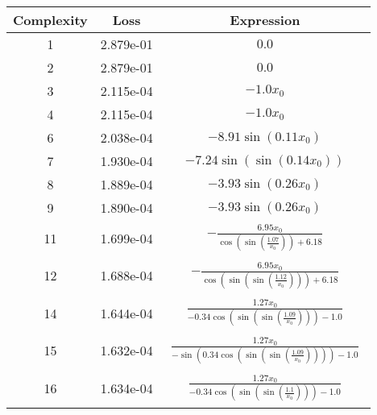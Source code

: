 \begin{center}
        \begin{tabular}{|c|c|c|}
        \hline
        Complexity & Loss & Expression \\
        \hline
        1 & 2.879e-01 & $\begin{aligned}0.0\end{aligned}$\\ \hline2 & 2.879e-01 & $\begin{aligned}0.0\end{aligned}$\\ \hline3 & 2.115e-04 & $\begin{aligned}- 1.0 x_{0}\end{aligned}$\\ \hline4 & 2.115e-04 & $\begin{aligned}- 1.0 x_{0}\end{aligned}$\\ \hline6 & 2.038e-04 & $\begin{aligned}- 8.91 \sin{\left(0.11 x_{0} \right)}\end{aligned}$\\ \hline7 & 1.930e-04 & $\begin{aligned}- 7.24 \sin{\left(\sin{\left(0.14 x_{0} \right)} \right)}\end{aligned}$\\ \hline8 & 1.889e-04 & $\begin{aligned}- 3.93 \sin{\left(0.26 x_{0} \right)}\end{aligned}$\\ \hline9 & 1.890e-04 & $\begin{aligned}- 3.93 \sin{\left(0.26 x_{0} \right)}\end{aligned}$\\ \hline11 & 1.699e-04 & $\begin{aligned}- \frac{6.95 x_{0}}{\cos{\left(\sin{\left(\frac{1.07}{x_{0}} \right)} \right)} + 6.18}\end{aligned}$\\ \hline12 & 1.688e-04 & $\begin{aligned}- \frac{6.95 x_{0}}{\cos{\left(\sin{\left(\sin{\left(\frac{1.12}{x_{0}} \right)} \right)} \right)} + 6.18}\end{aligned}$\\ \hline14 & 1.644e-04 & $\begin{aligned}\frac{1.27 x_{0}}{- 0.34 \cos{\left(\sin{\left(\sin{\left(\frac{1.09}{x_{0}} \right)} \right)} \right)} - 1.0}\end{aligned}$\\ \hline15 & 1.632e-04 & $\begin{aligned}\frac{1.27 x_{0}}{- \sin{\left(0.34 \cos{\left(\sin{\left(\sin{\left(\frac{1.09}{x_{0}} \right)} \right)} \right)} \right)} - 1.0}\end{aligned}$\\ \hline16 & 1.634e-04 & $\begin{aligned}\frac{1.27 x_{0}}{- 0.34 \cos{\left(\sin{\left(\sin{\left(\frac{1.1}{x_{0}} \right)} \right)} \right)} - 1.0}\end{aligned}$\\ 
\end{tabular}
\end{center}
